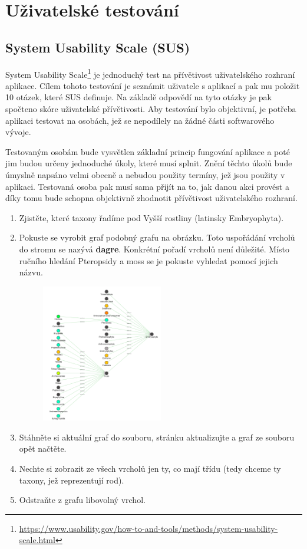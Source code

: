 \chapter{Uživatelské testování}

\section{System Usability Scale (SUS)}
System Usability Scale\footnote{\url{https://www.usability.gov/how-to-and-tools/methods/system-usability-scale.html}\nocite{SystemUsabilityScaleSUSUsabilitygov-2020-06-16}} je jednoduchý test na přívětivost uživatelského rozhraní aplikace. Cílem tohoto testování je seznámit uživatele s aplikací a pak mu položit 10 otázek, které SUS definuje. Na základě odpovědí na tyto otázky je pak spočteno skóre uživatelské přívětivosti. Aby testování bylo objektivní, je potřeba aplikaci testovat na osobách, jež se nepodílely na žádné části softwarového vývoje.

Testovaným osobám bude vysvětlen základní princip fungování aplikace a poté jim budou určeny jednoduché úkoly, které musí splnit. Znění těchto úkolů bude úmyslně napsáno velmi obecně a nebudou použity termíny, jež jsou použity v aplikaci. Testovaná osoba pak musí sama přijít na to, jak danou akci provést a díky tomu bude schopna objektivně zhodnotit přívětivost uživatelského rozhraní.

\begin{enumerate}
    \item Zjistěte, které taxony řadíme pod Vyšší rostliny (latinsky Embryophyta).
    \item Pokuste se vyrobit graf podobný grafu na obrázku. Toto uspořádání vrcholů do stromu se nazývá \textbf{dagre}. Konkrétní pořadí vrcholů není důležité. Místo ručního hledání Pteropsidy a moss se je pokuste vyhledat pomocí jejich názvu.
    \begin{figure}[h]
        \centering
        \includegraphics[width=0.5\textwidth]{media/sus-dagre.png}
    \end{figure}
    \item Stáhněte si aktuální graf do souboru, stránku aktualizujte a graf ze souboru opět načtěte.
    \item Nechte si zobrazit ze všech vrcholů jen ty, co mají třídu  (tedy chceme ty taxony, jež reprezentují rod).
    \item Odstraňte z grafu libovolný vrchol.
\end{enumerate}

